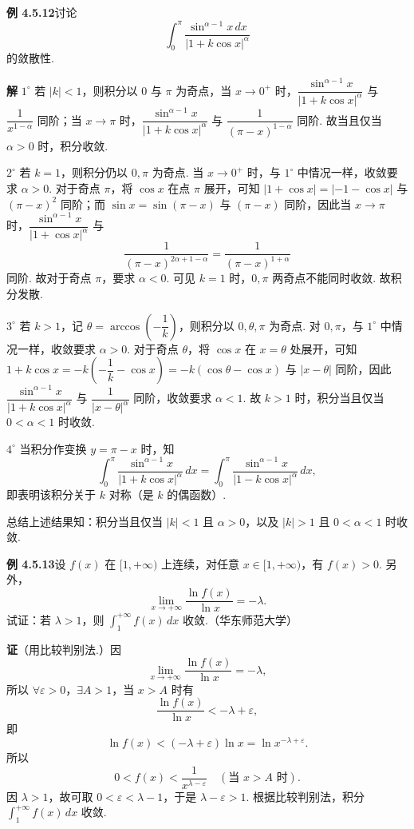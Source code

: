 \documentclass[UTF8, 12pt, fontset=fandol, oneside]{ctexart}
\begin{document}
\noindent\textbf{例 4.5.12}\quad 讨论
\[
\int_0^\pi\frac{\sin^{\alpha-1}x\,dx}{|1+k\cos x|^\alpha}
\]
的敛散性.

\noindent\textbf{解}\quad
$1^\circ$ 若 $|k|<1$，则积分以 $0$ 与 $\pi$ 为奇点，当 $x\to0^+$ 时，$\dfrac{\sin^{\alpha-1}x}{|1+k\cos x|^\alpha}$ 与 $\dfrac1{x^{1-\alpha}}$ 同阶；当 $x\to\pi$ 时，$\dfrac{\sin^{\alpha-1}x}{|1+k\cos x|^\alpha}$ 与 $\dfrac1{(\pi-x)^{1-\alpha}}$ 同阶. 故当且仅当 $\alpha>0$ 时，积分收敛.

$2^\circ$ 若 $k=1$，则积分仍以 $0,\pi$ 为奇点. 当 $x\to0^+$ 时，与 $1^\circ$ 中情况一样，收敛要求 $\alpha>0$. 对于奇点 $\pi$，将 $\cos x$ 在点 $\pi$ 展开，可知 $|1+\cos x|=|-1-\cos x|$ 与 $(\pi-x)^2$ 同阶；而 $\sin x=\sin(\pi-x)$ 与 $(\pi-x)$ 同阶，因此当 $x\to\pi$ 时，$\dfrac{\sin^{\alpha-1}x}{|1+\cos x|^\alpha}$ 与
\[
\frac1{(\pi-x)^{2\alpha+1-\alpha}}
=\frac1{(\pi-x)^{1+\alpha}}
\]
同阶. 故对于奇点 $\pi$，要求 $\alpha<0$. 可见 $k=1$ 时，$0,\pi$ 两奇点不能同时收敛. 故积分发散.

$3^\circ$ 若 $k>1$，记 $\theta=\arccos\left(-\dfrac1k\right)$，则积分以 $0,\theta,\pi$ 为奇点. 对 $0,\pi$，与 $1^\circ$ 中情况一样，收敛要求 $\alpha>0$. 对于奇点 $\theta$，将 $\cos x$ 在 $x=\theta$ 处展开，可知 $1+k\cos x=-k\left(-\dfrac1k-\cos x\right)=-k(\cos\theta-\cos x)$ 与 $|x-\theta|$ 同阶，因此 $\dfrac{\sin^{\alpha-1}x}{|1+k\cos x|^\alpha}$ 与 $\dfrac1{|x-\theta|^\alpha}$ 同阶，收敛要求 $\alpha<1$. 故 $k>1$ 时，积分当且仅当 $0<\alpha<1$ 时收敛.

$4^\circ$ 当积分作变换 $y=\pi-x$ 时，知
\[
\int_0^\pi\frac{\sin^{\alpha-1}x}{|1+k\cos x|^\alpha}\,dx
=\int_0^\pi\frac{\sin^{\alpha-1}x}{|1-k\cos x|^\alpha}\,dx,
\]
即表明该积分关于 $k$ 对称（是 $k$ 的偶函数）.

总结上述结果知：积分当且仅当 $|k|<1$ 且 $\alpha>0$，以及 $|k|>1$ 且 $0<\alpha<1$ 时收敛.

\noindent\textbf{例 4.5.13}\quad 设 $f(x)$ 在 $[1,+\infty)$ 上连续，对任意 $x\in[1,+\infty)$，有 $f(x)>0$. 另外，
\[
\lim_{x\to+\infty}\frac{\ln f(x)}{\ln x}=-\lambda.
\]
试证：若 $\lambda>1$，则 $\displaystyle\int_1^{+\infty}f(x)\,dx$ 收敛.（华东师范大学）

\noindent\textbf{证}\quad （用比较判别法.）因
\[
\lim_{x\to+\infty}\frac{\ln f(x)}{\ln x}=-\lambda,
\]
所以 $\forall\varepsilon>0$，$\exists A>1$，当 $x>A$ 时有
\[
\frac{\ln f(x)}{\ln x}<-\lambda+\varepsilon,
\]
即
\[
\ln f(x)<(-\lambda+\varepsilon)\ln x=\ln x^{-\lambda+\varepsilon}.
\]
所以
\[
0<f(x)<\frac1{x^{\lambda-\varepsilon}}\quad(\text{当 }x>A\text{ 时}).
\]
因 $\lambda>1$，故可取 $0<\varepsilon<\lambda-1$，于是 $\lambda-\varepsilon>1$. 根据比较判别法，积分 $\displaystyle\int_1^{+\infty}f(x)\,dx$ 收敛.
\end{document}
